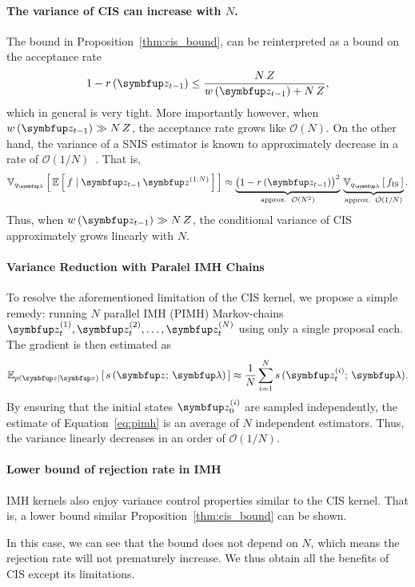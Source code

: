 \paragraph{The variance of CIS can increase with \(N\).}
The bound in Proposition~\ref{thm:cis_bound}, can be reinterpreted as a bound on the acceptance rate 
\begin{align}
  1 - r\,(\vz_{t-1}) \leq \frac{N\,Z}{ w\,(\vz_{t-1}) + N\,Z},
\end{align}
which in general is very tight.
More importantly however, when \(w\,(\vz_{t-1}) \gg N\,Z\), the acceptance rate grows like \(\mathcal{O}(N)\).
On the other hand, the variance of a SNIS estimator is known to approximately decrease in a rate of \(\mathcal{O}(1/N)\)~\citep{kong_sequential_1994, robert_monte_2004, elvira_rethinking_2018}.
That is, 
\begin{align}
  \Vsub{q_{\vlambda}}{ \E{ f \mid \vz_{t-1}\,\vz^{(1:N)} } } \approx \underbrace{{\big(1 - r\,(\vz_{t-1})\big)}^2}_{\text{approx.}\;\;\mathcal{O}(N^2)} \,
  \underbrace{\Vsub{q_{\vlambda}}{ f_{\text{IS}} }}_{\text{approx.}\;\;\mathcal{O}(1/N)}.
\end{align}
Thus, when \(w\,(\vz_{t-1})\gg N\,Z\), the conditional variance of CIS approximately grows linearly with \(N\).

\paragraph{Variance Reduction with Paralel IMH Chains}
To resolve the aforementioned limitation of the CIS kernel, we propose a simple remedy: running \(N\) parallel IMH (PIMH) Markov-chains \(\vz_t^{(1)}, \vz_t^{(2)}, \ldots, \vz_t^{(N)}\) using only a single proposal each.
The gradient is then estimated as
\begin{align}
  \Esub{p(\vz\mid\vx)}{ s\,(\vz;\,\vlambda) } \approx \frac{1}{N} \sum_{i=1}^N s\,(\vz_t^{(i)};\,\vlambda).\label{eq:pimh}
\end{align}
By ensuring that the initial states \(\vz_{0}^{(i)}\) are sampled independently, the estimate of Equation~\eqref{eq:pimh} is an average of \(N\) independent estimators.
Thus, the variance linearly decreases in an order of \(\mathcal{O}(1/N)\).

\paragraph{Lower bound of rejection rate in IMH}
IMH kernels also enjoy variance control properties similar to the CIS kernel.
That is, a lower bound similar Proposition~\eqref{thm:cis_bound} can be shown.
%

%
In this case, we can see that the bound does not depend on \(N\), which means the rejection rate will not prematurely increase.
We thus obtain all the benefits of CIS except its limitations.

